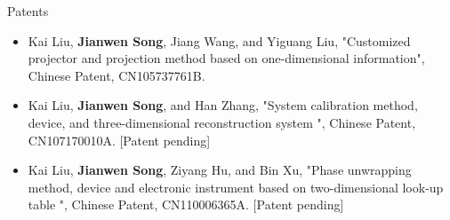 \documentclass{resume} %
\begin{document}
\begin{rSection}{Patents}
\begin{itemize}[leftmargin=*]
	\item Kai Liu, {\bf Jianwen Song}, Jiang Wang, and Yiguang Liu, "Customized projector and projection method based on one-dimensional information", Chinese Patent, CN105737761B.
	\item Kai Liu, {\bf Jianwen Song}, and Han Zhang, "System calibration method, device, and three-dimensional reconstruction system ", Chinese Patent, CN107170010A. [Patent pending]
	\item Kai Liu, {\bf Jianwen Song}, Ziyang Hu, and Bin Xu, "Phase unwrapping method, device and electronic instrument based on two-dimensional look-up table ", Chinese Patent, CN110006365A. [Patent pending]
\end{itemize}
	
\end{rSection}

\end{document}
